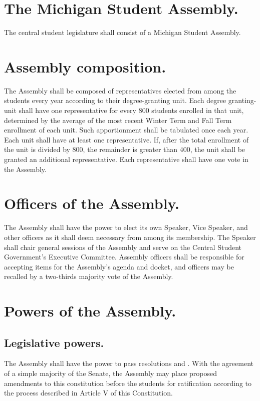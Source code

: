 
\section{The Michigan Student Assembly.}
    The central student legislature shall consist of a Michigan Student Assembly.

\section{Assembly composition.}
    The Assembly shall be composed of representatives elected from among the students every year according to their degree-granting unit. Each degree granting-unit shall have one representative for every 800 students enrolled in that unit, determined by the average of the most recent Winter Term and Fall Term enrollment of each unit. Such apportionment shall be tabulated once each year. Each unit shall have at least one representative. If, after the total enrollment of the unit is divided by 800, the remainder is greater than 400, the unit shall be granted an additional representative. Each representative shall have one vote in the Assembly. 

\section{Officers of the Assembly.}
    The Assembly shall have the power to elect its own Speaker, Vice Speaker, and other officers as it shall deem necessary from among its membership. The Speaker shall chair general sessions of the Assembly and serve on the Central Student Government's Executive Committee. Assembly officers shall be responsible for accepting items for the Assembly's agenda and docket, and officers may be recalled by a two-thirds majority vote of the Assembly.

\section{Powers of the Assembly.}

\subsection{Legislative powers.}
    The Assembly shall have the power to pass resolutions and . With the agreement of a simple majority of the Senate, the Assembly may place proposed amendments to this constitution before the students for ratification according to the process described in Article V of this Constitution.

